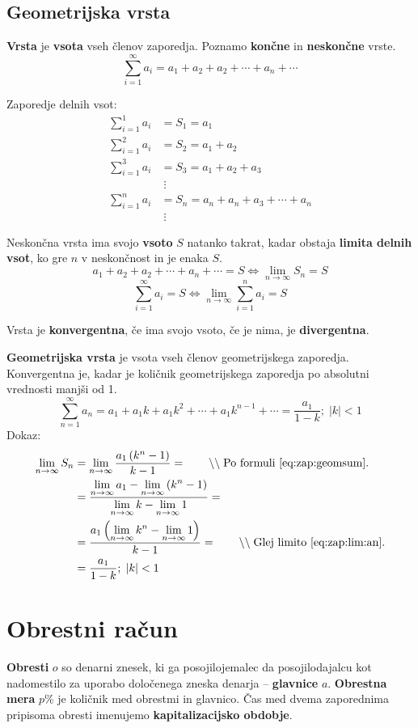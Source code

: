 \documentclass[a4paper,oneside,12pt,fleqn]{article}
\newcommand{\comment}[1]{\ensuremath{\qquad\backslash\backslash\;}\textnormal{#1}}
\def\limi{\displaystyle\lim_{n\to\infty}} %
\def\sumi{\displaystyle\sum^{\infty}} %
\renewcommand\iff\Leftrightarrow
\numberwithin{equation}{section}
\begin{document}
\subsection{Geometrijska vrsta}
\label{sec:zap:geovrst}
\textbf{Vrsta} je \textbf{vsota} vseh členov zaporedja. Poznamo \textbf{končne} in
\textbf{neskončne} vrste.
\[ \sumi_{i=1} a_i = a_1 + a_2 + a_2 + \cdots + a_n + \cdots \]

Zaporedje delnih vsot:
\begin{align*}
  \sum^1_{i=1} a_i &= S_1 = a_1 \\
  \sum^2_{i=1} a_i &= S_2 = a_1 + a_2 \\
  \sum^3_{i=1} a_i &= S_3 = a_1 + a_2 + a_3 \\[-10pt]
  & \; \vdots \\[-10pt]
  \sum^n_{i=1} a_i &= S_n = a_n + a_n + a_3 + \cdots + a_n \\[-10pt]
  & \; \vdots
\end{align*}

Neskončna vrsta ima svojo \textbf{vsoto} $S$ natanko takrat, kadar obstaja \textbf{limita
delnih vsot}, ko gre
$n$ v neskončnost in je enaka $S$.
\[ a_1 + a_2 + a_2 + \cdots + a_n + \cdots = S \iff \limi S_n = S \]
\[ \sumi_{i=1} a_i = S \iff \limi{ \sum^n_{i=1}a_i} = S \]

Vrsta je \textbf{konvergentna}, če ima svojo vsoto, če je nima, je \textbf{divergentna}.

\textbf{Geometrijska vrsta} je vsota vseh členov geometrijskega zaporedja. Konvergentna
je, kadar je količnik geometrijskega zaporedja po absolutni vrednosti manjši od 1.
\[ \sumi_{n=1}a_n = a_1 + a_1k + a_1k^2 + \cdots + a_1k^{n-1} + \cdots = \frac{a_1}{1-k};
\;  \left|k\right| < 1 \]
Dokaz:
\begin{align*}
   \limi S_n &= \limi \frac{a_1 \left( k^n - 1 \right)}{k-1} = \comment{Po formuli
  \eqref{eq:zap:geomsum}.} \\
  & = \frac{\limi a_1 - \limi \left( k^n-1 \right)}{\limi k - \limi1} = \\
  & = \frac{a_1 \left(\limi k^n - \limi 1 \right)}{k-1} = \comment{Glej limito~\eqref{eq:zap:lim:an}.} \\
  & = \frac{a_1}{1-k}; \; \left|k\right|<1
\end{align*}

\section{Obrestni račun}
\label{sec:obrest}
\textbf{Obresti} $o$ so denarni znesek, ki ga posojilojemalec da posojilodajalcu kot nadomestilo za
uporabo določenega zneska denarja -- \textbf{glavnice} $a$. \textbf{Obrestna mera} $p\%$ je količnik
med obrestmi in glavnico. Čas med dvema zaporednima pripisoma obresti imenujemo
\textbf{kapitalizacijsko obdobje}.
\end{document}
